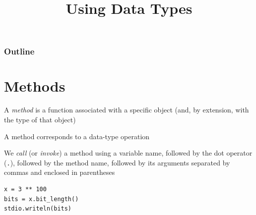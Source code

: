 \documentclass[8pt,a4paper,compress,handout]{beamer}
\title{Using Data Types}
\date{}
\begin{document}
\begin{frame}
\vfill
\titlepage
\end{frame}

\begin{frame}
\frametitle{Outline}
\tableofcontents
\end{frame}

\section{Methods}
\begin{frame}[fragile]
A \emph{method} is a function associated with a specific object (and, by extension, with the type of that object)

\bigskip

A method corresponds to a data-type operation

\bigskip

We \emph{call} (or \emph{invoke}) a method using a variable name, followed by the dot operator (\lstinline{.}), followed by the method name, followed by its arguments separated by commas and enclosed in parentheses

\begin{lstlisting}[language={}]
x = 3 ** 100
bits = x.bit_length()
stdio.writeln(bits)
\end{lstlisting}
\end{frame}
\end{document}
